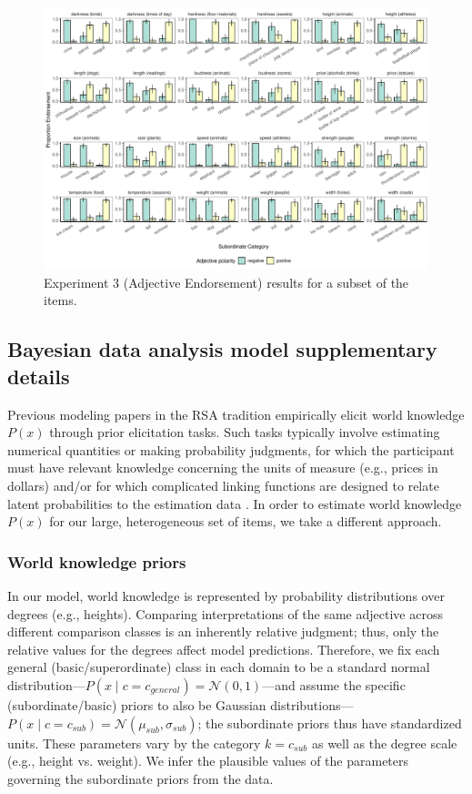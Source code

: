 \documentclass[doc]{apa6}
\begin{document}
\begin{figure}[t!]
\centering
\includegraphics[width=\textwidth]{figs/bars_adj_finalExpt_pilot_byItem.pdf}
\caption{Experiment 3 (Adjective Endorsement) results for a subset of the items.}\label{fig:adjEndorseItems}
\end{figure}

\subsection{Bayesian data analysis model supplementary details}

Previous modeling papers in the RSA tradition empirically elicit world knowledge $P(x)$ through prior elicitation tasks.
Such tasks typically involve estimating numerical quantities or making probability judgments, for which the participant must have relevant knowledge concerning the units of measure (e.g., prices in dollars) and/or for which complicated linking functions are designed to relate latent probabilities to the estimation data \cite{Franke2016}.
In order to estimate world knowledge $P(x)$ for our large, heterogeneous set of items, we take a different approach.

\subsubsection{World knowledge priors}

In our model, world knowledge is represented by probability distributions over degrees (e.g., heights).
Comparing interpretations of the same adjective across different comparison classes is an inherently relative judgment; thus, only the relative values for the degrees affect model predictions.
Therefore, we fix each general (basic/superordinate) class in each domain to be a standard normal distribution---$P(x \mid c = c_{general}) = \mathcal{N}(0, 1)$---and assume the specific (subordinate/basic) priors to also be Gaussian distributions---\(P(x \mid c = c_{sub}) = \mathcal{N}(\mu_{sub}, \sigma_{sub})\); the subordinate priors thus have standardized units.
These parameters vary by the category $k = c_{sub}$ as well as the degree scale (e.g., height vs. weight).
We infer the plausible values of the parameters governing the subordinate priors from the data.
\end{document}
